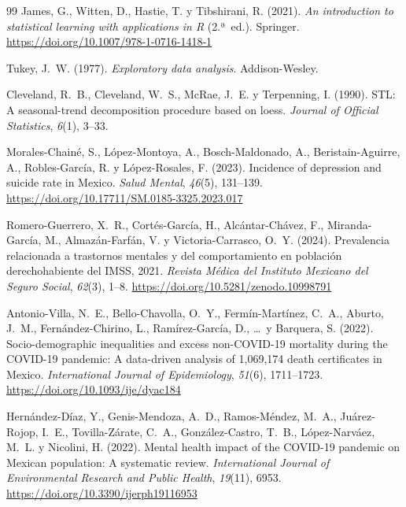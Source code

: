\documentclass[11pt,a4paper]{article}
\begin{document}
\begin{thebibliography}{99}
James, G., Witten, D., Hastie, T. y Tibshirani, R. (2021).
\newblock \emph{An introduction to statistical learning with applications in R} (2.ª~ed.).
\newblock Springer.
\newblock \url{https://doi.org/10.1007/978-1-0716-1418-1}

Tukey, J.~W. (1977).
\newblock \emph{Exploratory data analysis}.
\newblock Addison-Wesley.

Cleveland, R.~B., Cleveland, W.~S., McRae, J.~E. y Terpenning, I. (1990).
\newblock STL: A seasonal-trend decomposition procedure based on loess.
\newblock \emph{Journal of Official Statistics}, \emph{6}(1), 3--33.

Morales-Chainé, S., López-Montoya, A., Bosch-Maldonado, A., Beristain-Aguirre, A., Robles-García, R. y López-Rosales, F. (2023).
\newblock Incidence of depression and suicide rate in Mexico.
\newblock \emph{Salud Mental}, \emph{46}(5), 131--139.
\newblock \url{https://doi.org/10.17711/SM.0185-3325.2023.017}

Romero-Guerrero, X.~R., Cortés-García, H., Alcántar-Chávez, F., Miranda-García, M., Almazán-Farfán, V. y Victoria-Carrasco, O.~Y. (2024).
\newblock Prevalencia relacionada a trastornos mentales y del comportamiento en población derechohabiente del IMSS, 2021.
\newblock \emph{Revista Médica del Instituto Mexicano del Seguro Social}, \emph{62}(3), 1--8.
\newblock \url{https://doi.org/10.5281/zenodo.10998791}

Antonio-Villa, N.~E., Bello-Chavolla, O.~Y., Fermín-Martínez, C.~A., Aburto, J.~M., Fernández-Chirino, L., Ramírez-García, D., \ldots\ y Barquera, S. (2022).
\newblock Socio-demographic inequalities and excess non-COVID-19 mortality during the COVID-19 pandemic: A data-driven analysis of 1,069,174 death certificates in Mexico.
\newblock \emph{International Journal of Epidemiology}, \emph{51}(6), 1711--1723.
\newblock \url{https://doi.org/10.1093/ije/dyac184}

Hernández-Díaz, Y., Genis-Mendoza, A.~D., Ramos-Méndez, M.~A., Juárez-Rojop, I.~E., Tovilla-Zárate, C.~A., González-Castro, T.~B., López-Narváez, M.~L. y Nicolini, H. (2022).
\newblock Mental health impact of the COVID-19 pandemic on Mexican population: A systematic review.
\newblock \emph{International Journal of Environmental Research and Public Health}, \emph{19}(11), 6953.
\newblock \url{https://doi.org/10.3390/ijerph19116953}


\end{thebibliography}
\end{document}
